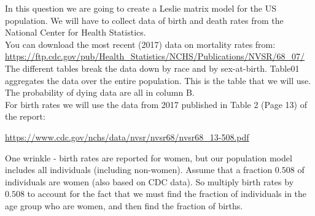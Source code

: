 \documentclass[addpoints, 11pt]{exam}
\begin{document}
\begin{questions}
\question In this question we are going to create a Leslie matrix model for the US population. We will have to collect data of birth and death rates from the National Center for Health Statistics.\\

\indent You can download the most recent (2017) data on mortality rates from:
\url{https://ftp.cdc.gov/pub/Health_Statistics/NCHS/Publications/NVSR/68_07/}\\

\indent The different tables break the data down by race and by sex-at-birth. Table01 aggregates the data over the entire population. This is the table that we will use. The probability of dying data are all in column B.\\

\indent For birth rates we will use the data from 2017 published in Table 2 (Page 13) of the report:

\url{https://www.cdc.gov/nchs/data/nvsr/nvsr68/nvsr68_13-508.pdf}

\indent One wrinkle - birth rates are reported for women, but our population model includes all individuals (including non-women). Assume that a fraction $0.508$ of individuals are women (also based on CDC data). So multiply birth rates by $0.508$ to account for the fact that we must find the fraction of individuals in the age group who are women, and then find the fraction of births.\\


\end{questions}
\end{document}
